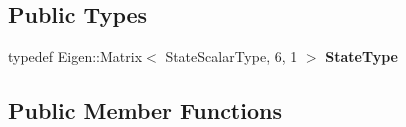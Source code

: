 \subsection*{Public Types}
\begin{DoxyCompactItemize}
\item 
typedef Eigen\+::\+Matrix$<$ State\+Scalar\+Type, 6, 1 $>$ {\bfseries State\+Type}\hypertarget{classtudat_1_1ephemerides_1_1CompositeEphemeris_a70e4010d05963c8ff6ee9a918e10cee7}{}\label{classtudat_1_1ephemerides_1_1CompositeEphemeris_a70e4010d05963c8ff6ee9a918e10cee7}

\end{DoxyCompactItemize}
\subsection*{Public Member Functions}

